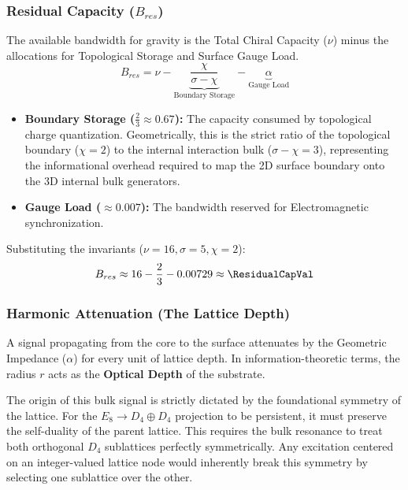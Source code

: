 \subsubsection{Residual Capacity (\texorpdfstring{$B_{res}$}{Bres})}
The available bandwidth for gravity is the Total Chiral Capacity ($\nu$) minus the allocations for Topological Storage and Surface Gauge Load.
\begin{equation}
B_{res} = \nu - \underbrace{\frac{\chi}{\sigma-\chi}}_{\text{Boundary Storage}} - \underbrace{\alpha}_{\text{Gauge Load}}
\end{equation}
\begin{itemize}
    \item \textbf{Boundary Storage ($\frac{2}{3} \approx 0.67$):} The capacity consumed by topological charge quantization. Geometrically, this is the strict ratio of the topological boundary ($\chi=2$) to the internal interaction bulk ($\sigma-\chi=3$), representing the informational overhead required to map the 2D surface boundary onto the 3D internal bulk generators.
    \item \textbf{Gauge Load ($\approx 0.007$):} The bandwidth reserved for Electromagnetic synchronization.
\end{itemize}
Substituting the invariants ($\nu=16, \sigma=5, \chi=2$):
\begin{equation}
B_{res} \approx 16 - \frac{2}{3} - 0.00729 \approx \mathbf{\ResidualCapVal}
\end{equation}

\subsubsection{Harmonic Attenuation (The Lattice Depth)}
A signal propagating from the core to the surface attenuates by the Geometric Impedance ($\alpha$) for every unit of lattice depth. In information-theoretic terms, the radius $r$ acts as the \textbf{Optical Depth} of the substrate.

The origin of this bulk signal is strictly dictated by the foundational symmetry of the lattice. For the $E_8 \to D_4 \oplus D_4$ projection to be persistent, it must preserve the self-duality of the parent lattice. This requires the bulk resonance to treat both orthogonal $D_4$ sublattices perfectly symmetrically. Any excitation centered on an integer-valued lattice node would inherently break this symmetry by selecting one sublattice over the other. 

